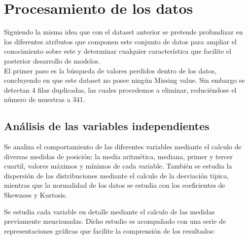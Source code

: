 \vspace{1cm}
\section{Procesamiento de los datos}
Siguiendo la misma idea que con el dataset anterior se pretende profundizar en los diferentes atributos que componen este conjunto de datos para ampliar el conocimiento sobre este y determinar cualquier característica que facilite el posterior desarrollo de modelos. \\

El primer paso es la búsqueda de valores perdidos dentro de los datos, concluyendo en que este dataset no posee ningún Missing value.
Sin embargo se detectan 4 filas duplicadas, las cuales procedemos a eliminar, reduciéndose el número de muestras a 341.




\newpage
\subsection{Análisis de las variables independientes}\label{anali}
Se analiza el comportamiento de las diferentes variables mediante el calculo de diversas medidas de posición: la media aritmética, mediana, primer y tercer cuartil, valores máximos y mínimos de cada variable. También se estudia la dispersión de las distribuciones mediante el calculo  de la desviación típica, mientras que la normalidad de los datos se estudia con los coeficientes de Skewness y Kurtosis.

Se estudia cada variable en detalle mediante el calculo de las medidas previamente mencionadas. Dicho estudio es acompañado con una serie de representaciones gráficas que facilite la comprensión de los resultados:

